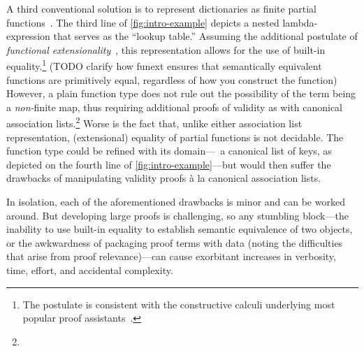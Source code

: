 A third conventional solution is to represent dictionaries as finite partial functions~\citep{XXX,XXX,XXX}.
%
The third line of \autoref{fig:intro-example} depicts a nested lambda-expression that serves as the ``lookup table.'' 
%
Assuming the additional postulate of \emph{functional extensionality}~\cite{XXX}, this representation allows for the use of built-in equality.\footnote{\hspace{0.01in}%
%
The postulate is consistent with the constructive calculi underlying most popular proof assistants~\citep{XXX}.
%
}
(TODO clarify how funext ensures that semantically equivalent functions are primitively equal, regardless of how you construct the function)
%
However, a plain function type does not rule out the possibility of the term being a \emph{non-}finite map, thus requiring additional proofs of validity as with canonical association lists.\footnote{\hspace{0.01in}%
%
%
}
%
Worse is the fact that, unlike either association list representation, (extensional) equality of partial functions is not decidable.
%
The function type could be refined with its domain---\ie{}~a canonical list of keys, as depicted on the fourth line of \autoref{fig:intro-example}---but would then suffer the drawbacks of manipulating validity proofs \`{a} la canonical association lists.

In isolation, each of the aforementioned drawbacks is minor and can be worked around.
%
But developing large proofs is challenging, so any stumbling block---the inability to use built-in equality to establish semantic equivalence of two objects, or the awkwardness of packaging proof terms with data (noting the difficulties that arise from proof relevance)---can cause exorbitant increases in verbosity, time, effort, and accidental complexity.



